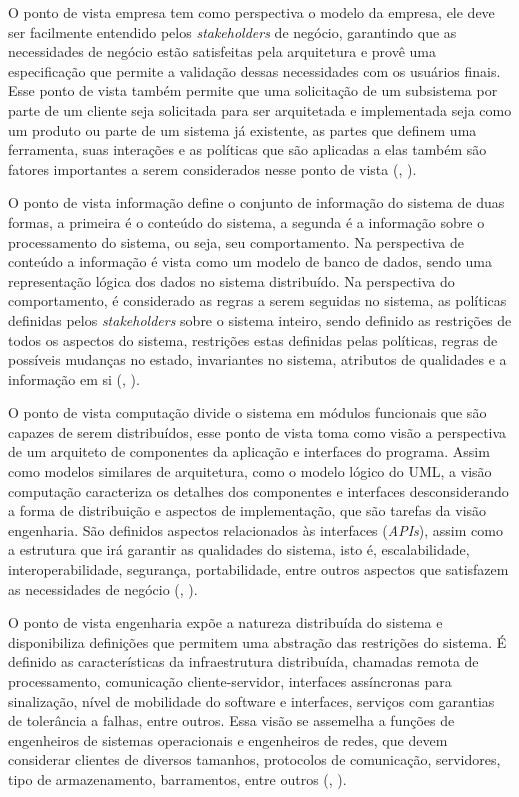 \documentclass[]{politex}
\begin{document}
O ponto de vista empresa tem como perspectiva o modelo da empresa, ele deve ser facilmente entendido pelos \textit{stakeholders} de negócio, garantindo que as necessidades de negócio estão satisfeitas pela arquitetura e provê uma especificação que permite a validação dessas necessidades com os usuários finais. Esse ponto de vista também permite que uma solicitação de um subsistema por parte de um cliente seja solicitada para ser arquitetada e implementada seja como um produto ou parte de um sistema já existente, as partes que definem uma ferramenta, suas interações e as políticas que são aplicadas a elas também são fatores importantes a serem considerados nesse ponto de vista (, \citeyear{putman2001architecting}).

O ponto de vista informação define o conjunto de informação do sistema de duas formas, a primeira é o conteúdo do sistema, a segunda é a informação sobre o processamento do sistema, ou seja, seu comportamento. Na perspectiva de conteúdo a informação é vista como um modelo de banco de dados, sendo uma representação lógica dos dados no sistema distribuído. Na perspectiva do comportamento, é considerado as regras a serem seguidas no sistema, as políticas definidas pelos \textit{stakeholders} sobre o sistema inteiro, sendo definido as restrições de todos os aspectos do sistema, restrições estas definidas pelas políticas, regras de possíveis mudanças no estado, invariantes no sistema, atributos de qualidades e a informação em si (, \citeyear{putman2001architecting}).

O ponto de vista computação divide o sistema em módulos funcionais que são capazes de serem distribuídos, esse ponto de vista toma como visão a perspectiva de um arquiteto de componentes da aplicação e interfaces do programa. Assim como modelos similares de arquitetura, como o modelo lógico do UML, a visão computação caracteriza os detalhes dos componentes e interfaces desconsiderando a forma de distribuição e aspectos de implementação, que são tarefas da visão engenharia. São definidos aspectos relacionados às interfaces (\textit{APIs}), assim como a estrutura que irá garantir as qualidades do sistema, isto é, escalabilidade, interoperabilidade, segurança, portabilidade, entre outros aspectos que satisfazem as necessidades de negócio (, \citeyear{putman2001architecting}).

O ponto de vista engenharia expõe  a natureza distribuída do sistema e disponibiliza definições que permitem uma abstração das restrições do sistema. É definido as características da infraestrutura distribuída, chamadas remota de processamento, comunicação cliente-servidor, interfaces assíncronas para sinalização, nível de mobilidade do software e interfaces, serviços com garantias de tolerância a falhas, entre outros. Essa visão se assemelha a funções de engenheiros de sistemas operacionais e engenheiros de redes, que devem considerar clientes de diversos tamanhos, protocolos de comunicação, servidores, tipo de armazenamento, barramentos, entre outros (, \citeyear{putman2001architecting}).
\end{document}
